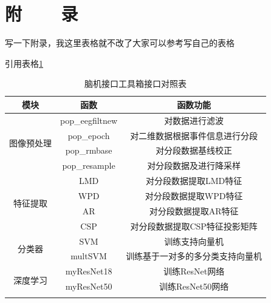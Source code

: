 
\renewcommand{\baselinestretch}{1.345}
\fontsize{12pt}{14.4pt}\selectfont
{}
\chapter*{附~~~~录}

写一下附录，我这里表格就不改了大家可以参考写自己的表格

引用表格\ref{label2}
\begin{table}[!ht]
	\centering
	\caption{脑机接口工具箱接口对照表}\label{label2}
	\fontsize{10.5}{13.125}\selectfont
	\setlength{\tabcolsep}{5mm}
	{
		\begin{tabular}{|c|c|c|}
			\hline
			模块                     & 函数              & 函数功能                                                      \\ \hline
			\multirow{4}{*}{图像预处理} & pop\_eegfiltnew & 对数据进行滤波                                                   \\ \cline{2-3} 
			& pop\_epoch      & 对二维数据根据事件信息进行分段                                           \\ \cline{2-3} 
			& pop\_rmbase     & 对分段数据基线校正                                                 \\ \cline{2-3} 
			& pop\_resample   & 对分段数据及进行降采样                                               \\ \hline
			\multirow{4}{*}{特征提取}  & LMD             & 对分段数据提取LMD特征                                              \\ \cline{2-3} 
			& WPD             & 对分段数据提取WPD特征                                              \\ \cline{2-3} 
			& AR              & 对分段数据提取AR特征                                               \\ \cline{2-3} 
			& CSP             & 对分段数据提取CSP特征投影矩阵                                          \\ \hline
			\multirow{2}{*}{分类器}   & SVM             & 训练支持向量机 \\ \cline{2-3} 
			& multSVM         & 训练基于一对多的多分类支持向量机                          \\ \hline
			\multirow{7}{*}{深度学习}  & myResNet18      & 训练ResNet网络                                                \\ \cline{2-3} 
			& myResNet50      & 训练ResNet50网络                                              \\ \cline{2-3} 

\end{tabular}}
\end{table}
